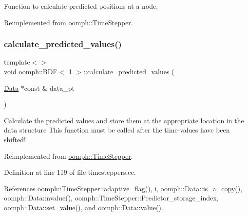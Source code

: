 Function to calculate predicted positions at a node. 



Reimplemented from \hyperlink{classoomph_1_1TimeStepper_a2e7fafceb9330ac971078cf9dc248701}{oomph\+::\+Time\+Stepper}.

\mbox{\label{classoomph_1_1BDF_a45086cba429e3a8d8b092e4ebe5b82b2}} 
\subsubsection{\texorpdfstring{calculate\+\_\+predicted\+\_\+values()}{calculate\_predicted\_values()}\hspace{0.1cm}{\footnotesize\ttfamily [1/4]}}
{\footnotesize\ttfamily template$<$$>$ \\
void \hyperlink{classoomph_1_1BDF}{oomph\+::\+B\+DF}$<$ 1 $>$\+::calculate\+\_\+predicted\+\_\+values (\begin{DoxyParamCaption}\item[{\hyperlink{classoomph_1_1Data}{Data} $\ast$const \&}]{data\+\_\+pt }\end{DoxyParamCaption})\hspace{0.3cm}{\ttfamily [virtual]}}

Calculate the predicted values and store them at the appropriate location in the data structure This function must be called after the time-\/values have been shifted! 

Reimplemented from \hyperlink{classoomph_1_1TimeStepper_a159d508b1ae643fe31b55da9ee789dbf}{oomph\+::\+Time\+Stepper}.



Definition at line 119 of file timesteppers.\+cc.



References oomph\+::\+Time\+Stepper\+::adaptive\+\_\+flag(), i, oomph\+::\+Data\+::is\+\_\+a\+\_\+copy(), oomph\+::\+Data\+::nvalue(), oomph\+::\+Time\+Stepper\+::\+Predictor\+\_\+storage\+\_\+index, oomph\+::\+Data\+::set\+\_\+value(), and oomph\+::\+Data\+::value().

\mbox{\label{classoomph_1_1BDF_a5fa759b3a661e7a41ea0dc21f894708d}} 
